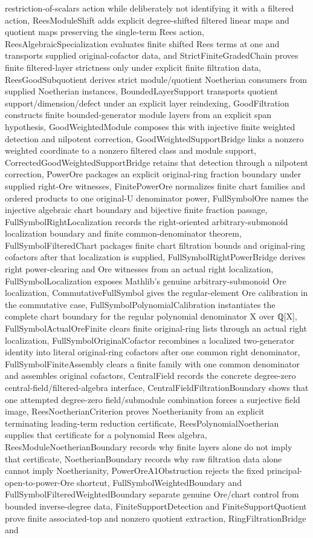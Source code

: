 restriction-of-scalars action while deliberately not identifying it with a filtered action, ReesModuleShift adds explicit degree-shifted filtered linear maps and quotient maps preserving the single-term Rees action, ReesAlgebraicSpecialization evaluates finite shifted Rees terms at one and transports supplied original-cofactor data, and StrictFiniteGradedChain proves finite filtered-layer strictness only under explicit finite filtration data, ReesGoodSubquotient derives strict module/quotient Noetherian consumers from supplied Noetherian instances, BoundedLayerSupport transports quotient support/dimension/defect under an explicit layer reindexing, GoodFiltration constructs finite bounded-generator module layers from an explicit span hypothesis, GoodWeightedModule composes this with injective finite weighted detection and nilpotent correction, GoodWeightedSupportBridge links a nonzero weighted coordinate to a nonzero filtered class and module support, CorrectedGoodWeightedSupportBridge retains that detection through a nilpotent correction, PowerOre packages an explicit original-ring fraction boundary under supplied right-Ore witnesses, FinitePowerOre normalizes finite chart families and ordered products to one original-U denominator power, FullSymbolOre names the injective algebraic chart boundary and bijective finite fraction passage, FullSymbolRightLocalization records the right-oriented arbitrary-submonoid localization boundary and finite common-denominator theorem, FullSymbolFilteredChart packages finite chart filtration bounds and original-ring cofactors after that localization is supplied, FullSymbolRightPowerBridge derives right power-clearing and Ore witnesses from an actual right localization, FullSymbolLocalization exposes Mathlib's genuine arbitrary-submonoid Ore localization, CommutativeFullSymbol gives the regular-element Ore calibration in the commutative case, FullSymbolPolynomialCalibration instantiates the complete chart boundary for the regular polynomial denominator X over ℚ[X], FullSymbolActualOreFinite clears finite original-ring lists through an actual right localization, FullSymbolOriginalCofactor recombines a localized two-generator identity into literal original-ring cofactors after one common right denominator, FullSymbolFiniteAssembly clears a finite family with one common denominator and assembles original cofactors, CentralField records the concrete degree-zero central-field/filtered-algebra interface, CentralFieldFiltrationBoundary shows that one attempted degree-zero field/submodule combination forces a surjective field image, ReesNoetherianCriterion proves Noetherianity from an explicit terminating leading-term reduction certificate, ReesPolynomialNoetherian supplies that certificate for a polynomial Rees algebra, ReesModuleNoetherianBoundary records why finite layers alone do not imply that certificate, NoetherianBoundary records why raw filtration data alone cannot imply Noetherianity, PowerOreA1Obstruction rejects the fixed principal-open-to-power-Ore shortcut, FullSymbolWeightedBoundary and FullSymbolFilteredWeightedBoundary separate genuine Ore/chart control from bounded inverse-degree data, FiniteSupportDetection and FiniteSupportQuotient prove finite associated-top and nonzero quotient extraction, RingFiltrationBridge and 